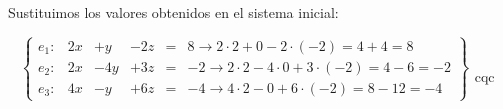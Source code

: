 \documentclass[palatino,nosec,nochap]{Docencia}
\begin{document}
\begin{problem}
Sustituimos los valores obtenidos en el sistema inicial:

\[
\left\{\begin{array}{lccccl}
e_1: &	2x &	+	y &		- 2z &	= & 8 \to 2·2 + 0 - 2·(-2) = 4+4 = 8\\
e_2: &	2x &	-	4y &	+ 3z &	= & -2 \to 2·2 - 4·0 + 3·(-2) = 4-6 = -2\\
e_3: &	4x &	-	y &		+ 6z &	= & -4 \to 4·2 - 0 + 6·(-2) = 8-12 = -4
\end{array}\right\}\begin{array}{c}\\\\\\\\\text{cqc}\end{array}
\]

\end{problem}
\end{document}
